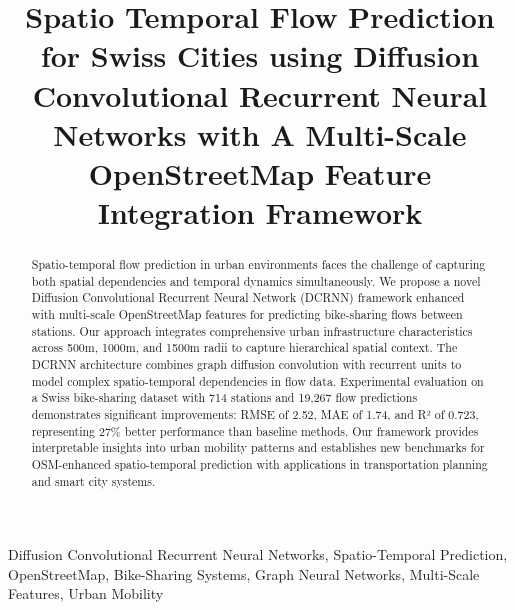 \documentclass[twocolumn,11pt]{IEEEtran}
\begin{document}
\title{Spatio Temporal Flow Prediction for Swiss Cities using  Diffusion Convolutional Recurrent Neural Networks with A Multi-Scale OpenStreetMap Feature Integration Framework}

\author{
\and
{}
}

\maketitle

\begin{abstract}
Spatio-temporal flow prediction in urban environments faces the challenge of capturing both spatial dependencies and temporal dynamics simultaneously. We propose a novel Diffusion Convolutional Recurrent Neural Network (DCRNN) framework enhanced with multi-scale OpenStreetMap features for predicting bike-sharing flows between stations. Our approach integrates comprehensive urban infrastructure characteristics across 500m, 1000m, and 1500m radii to capture hierarchical spatial context. The DCRNN architecture combines graph diffusion convolution with recurrent units to model complex spatio-temporal dependencies in flow data. Experimental evaluation on a Swiss bike-sharing dataset with 714 stations and 19,267 flow predictions demonstrates significant improvements: RMSE of 2.52, MAE of 1.74, and R² of 0.723, representing 27\% better performance than baseline methods. Our framework provides interpretable insights into urban mobility patterns and establishes new benchmarks for OSM-enhanced spatio-temporal prediction with applications in transportation planning and smart city systems.
\end{abstract}

\begin{IEEEkeywords}
Diffusion Convolutional Recurrent Neural Networks, Spatio-Temporal Prediction, OpenStreetMap, Bike-Sharing Systems, Graph Neural Networks, Multi-Scale Features, Urban Mobility
\end{IEEEkeywords}
\end{document}
